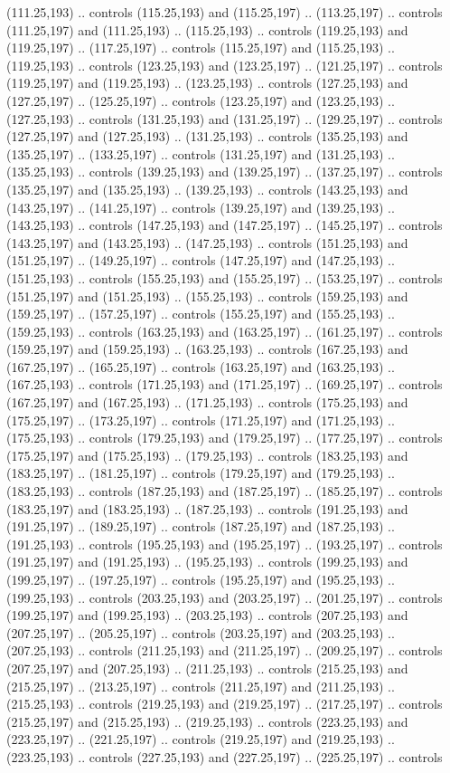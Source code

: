 \documentclass[twocolumn]{article}
\numberwithin{equation}{section}
\newcommand{\0}{\textcolor{gray}{0}}
\begin{document}
(111.25,193) .. controls (115.25,193) and (115.25,197) .. (113.25,197) .. controls (111.25,197) and (111.25,193) .. (115.25,193) .. controls (119.25,193) and (119.25,197) .. (117.25,197) .. controls (115.25,197) and (115.25,193) .. (119.25,193) .. controls (123.25,193) and (123.25,197) .. (121.25,197) .. controls (119.25,197) and (119.25,193) .. (123.25,193) .. controls (127.25,193) and (127.25,197) .. (125.25,197) .. controls (123.25,197) and (123.25,193) .. (127.25,193) .. controls (131.25,193) and (131.25,197) .. (129.25,197) .. controls (127.25,197) and (127.25,193) .. (131.25,193) .. controls (135.25,193) and (135.25,197) .. (133.25,197) .. controls (131.25,197) and (131.25,193) .. (135.25,193) .. controls (139.25,193) and (139.25,197) .. (137.25,197) .. controls (135.25,197) and (135.25,193) .. (139.25,193) .. controls (143.25,193) and (143.25,197) .. (141.25,197) .. controls (139.25,197) and (139.25,193) .. (143.25,193) .. controls (147.25,193) and (147.25,197) .. (145.25,197) .. controls (143.25,197) and (143.25,193) .. (147.25,193) .. controls (151.25,193) and (151.25,197) .. (149.25,197) .. controls (147.25,197) and (147.25,193) .. (151.25,193) .. controls (155.25,193) and (155.25,197) .. (153.25,197) .. controls (151.25,197) and (151.25,193) .. (155.25,193) .. controls (159.25,193) and (159.25,197) .. (157.25,197) .. controls (155.25,197) and (155.25,193) .. (159.25,193) .. controls (163.25,193) and (163.25,197) .. (161.25,197) .. controls (159.25,197) and (159.25,193) .. (163.25,193) .. controls (167.25,193) and (167.25,197) .. (165.25,197) .. controls (163.25,197) and (163.25,193) .. (167.25,193) .. controls (171.25,193) and (171.25,197) .. (169.25,197) .. controls (167.25,197) and (167.25,193) .. (171.25,193) .. controls (175.25,193) and (175.25,197) .. (173.25,197) .. controls (171.25,197) and (171.25,193) .. (175.25,193) .. controls (179.25,193) and (179.25,197) .. (177.25,197) .. controls (175.25,197) and (175.25,193) .. (179.25,193) .. controls (183.25,193) and (183.25,197) .. (181.25,197) .. controls (179.25,197) and (179.25,193) .. (183.25,193) .. controls (187.25,193) and (187.25,197) .. (185.25,197) .. controls (183.25,197) and (183.25,193) .. (187.25,193) .. controls (191.25,193) and (191.25,197) .. (189.25,197) .. controls (187.25,197) and (187.25,193) .. (191.25,193) .. controls (195.25,193) and (195.25,197) .. (193.25,197) .. controls (191.25,197) and (191.25,193) .. (195.25,193) .. controls (199.25,193) and (199.25,197) .. (197.25,197) .. controls (195.25,197) and (195.25,193) .. (199.25,193) .. controls (203.25,193) and (203.25,197) .. (201.25,197) .. controls (199.25,197) and (199.25,193) .. (203.25,193) .. controls (207.25,193) and (207.25,197) .. (205.25,197) .. controls (203.25,197) and (203.25,193) .. (207.25,193) .. controls (211.25,193) and (211.25,197) .. (209.25,197) .. controls (207.25,197) and (207.25,193) .. (211.25,193) .. controls (215.25,193) and (215.25,197) .. (213.25,197) .. controls (211.25,197) and (211.25,193) .. (215.25,193) .. controls (219.25,193) and (219.25,197) .. (217.25,197) .. controls (215.25,197) and (215.25,193) .. (219.25,193) .. controls (223.25,193) and (223.25,197) .. (221.25,197) .. controls (219.25,197) and (219.25,193) .. (223.25,193) .. controls (227.25,193) and (227.25,197) .. (225.25,197) .. controls 
\end{document}
